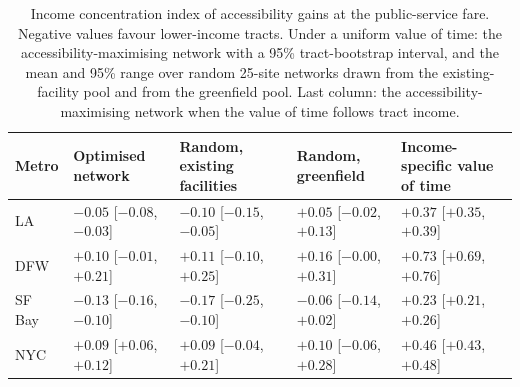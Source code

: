 \begin{table}[!htbp]
\centering
\caption{Income concentration index of accessibility gains at the public-service fare. Negative values favour lower-income tracts. Under a uniform value of time: the accessibility-maximising network with a 95\% tract-bootstrap interval, and the mean and 95\% range over random 25-site networks drawn from the existing-facility pool and from the greenfield pool. Last column: the accessibility-maximising network when the value of time follows tract income.}
\label{tab:direction}
\footnotesize
\begin{tabular}{lllll}
\toprule
Metro & Optimised network & Random, existing facilities & Random, greenfield & Income-specific value of time \\
\midrule
LA & $-0.05$ [$-0.08$, $-0.03$] & $-0.10$ [$-0.15$, $-0.05$] & $+0.05$ [$-0.02$, $+0.13$] & $+0.37$ [$+0.35$, $+0.39$] \\
DFW & $+0.10$ [$-0.01$, $+0.21$] & $+0.11$ [$-0.10$, $+0.25$] & $+0.16$ [$-0.00$, $+0.31$] & $+0.73$ [$+0.69$, $+0.76$] \\
SF Bay & $-0.13$ [$-0.16$, $-0.10$] & $-0.17$ [$-0.25$, $-0.10$] & $-0.06$ [$-0.14$, $+0.02$] & $+0.23$ [$+0.21$, $+0.26$] \\
NYC & $+0.09$ [$+0.06$, $+0.12$] & $+0.09$ [$-0.04$, $+0.21$] & $+0.10$ [$-0.06$, $+0.28$] & $+0.46$ [$+0.43$, $+0.48$] \\
\bottomrule
\end{tabular}
\end{table}
